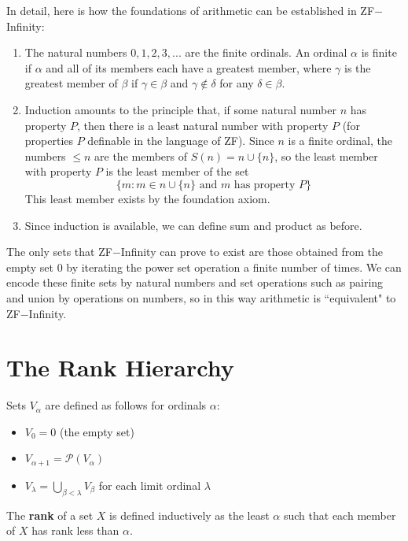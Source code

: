 \documentclass[12pt, a4paper, oneside, openright, titlepage]{book}
\begin{document}
In detail, here is how the foundations of arithmetic can be established in ZF$-$Infinity:
\begin{enumerate}
    \item The natural numbers $0,1,2,3,...$ are the finite ordinals. An ordinal $\alpha$ is finite if $\alpha$ and all of its members each have a greatest member, where $\gamma$ is the greatest member of $\beta$ if $\gamma \in \beta$ and $\gamma \notin \delta$ for any $\delta \in \beta$.
    \item Induction amounts to the principle that, if some natural number $n$ has property $P$, then there is a least natural number with property $P$ (for properties $P$ definable in the language of ZF). Since $n$ is a finite ordinal, the numbers $\leq n$ are the members of $S(n) = n \cup \{n\}$, so the least member with property $P$ is the least member of the set \begin{equation*}
            \{m:m \in n\cup \{n\}\text{ and $m$ has property $P$}\}
    \end{equation*}
        This least member exists by the foundation axiom.
    \item Since induction is available, we can define sum and product as before.
\end{enumerate}

The only sets that ZF$-$Infinity can prove to exist are those obtained from the empty set $0$ by iterating the power set operation a finite number of times. We can encode these finite sets by natural numbers and set operations such as pairing and union by operations on numbers, so in this way arithmetic is ``equivalent" to ZF$-$Infinity.

\section{The Rank Hierarchy}

\begin{defn}
    Sets $V_{\alpha}$ are defined as follows for ordinals $\alpha$: \begin{itemize}
        \item $V_0 = 0$ (the empty set)
        \item $V_{\alpha+1}= \mathcal{P}(V_{\alpha})$ \\
        \item $V_{\lambda} = \bigcup_{\beta < \lambda}V_{\beta}$ for each limit ordinal $\lambda$
    \end{itemize}
    The \textbf{rank} of a set $X$ is defined inductively as the least $\alpha$ such that each member of $X$ has rank less than $\alpha$.
\end{defn}
\end{document}
